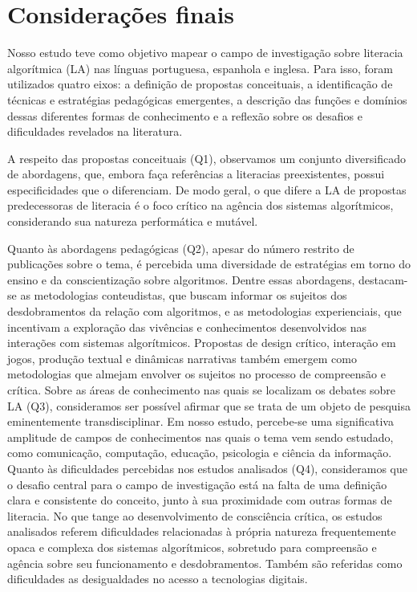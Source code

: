\section{Considerações finais}\label{sec-consideraçõesfinais}

Nosso estudo teve como objetivo mapear o campo de investigação sobre
literacia algorítmica (LA) nas línguas portuguesa, espanhola e inglesa.
Para isso, foram utilizados quatro eixos: a definição de propostas
conceituais, a identificação de técnicas e estratégias pedagógicas
emergentes, a descrição das funções e domínios dessas diferentes formas
de conhecimento e a reflexão sobre os desafios e dificuldades revelados
na literatura.

A respeito das propostas conceituais (Q1), observamos um conjunto
diversificado de abordagens, que, embora faça referências a literacias
preexistentes, possui especificidades que o diferenciam. De modo geral,
o que difere a LA de propostas predecessoras de literacia é o foco
crítico na agência dos sistemas algorítmicos, considerando sua natureza
performática e mutável.

Quanto às abordagens pedagógicas (Q2), apesar do número restrito de
publicações sobre o tema, é percebida uma diversidade de estratégias em
torno do ensino e da conscientização sobre algoritmos. Dentre essas
abordagens, destacam-se as metodologias conteudistas, que buscam
informar os sujeitos dos desdobramentos da relação com algoritmos, e as
metodologias experienciais, que incentivam a exploração das vivências e
conhecimentos desenvolvidos nas interações com sistemas algorítmicos.
Propostas de design crítico, interação em jogos, produção textual e
dinâmicas narrativas também emergem como metodologias que almejam
envolver os sujeitos no processo de compreensão e crítica. Sobre as
áreas de conhecimento nas quais se localizam os debates sobre LA (Q3),
consideramos ser possível afirmar que se trata de um objeto de pesquisa
eminentemente transdisciplinar. Em nosso estudo, percebe-se uma
significativa amplitude de campos de conhecimentos nas quais o tema vem
sendo estudado, como comunicação, computação, educação, psicologia e
ciência da informação. Quanto às dificuldades percebidas nos estudos
analisados (Q4), consideramos que o desafio central para o campo de
investigação está na falta de uma definição clara e consistente do
conceito, junto à sua proximidade com outras formas de literacia. No que
tange ao desenvolvimento de consciência crítica, os estudos analisados
referem dificuldades relacionadas à própria natureza frequentemente
opaca e complexa dos sistemas algorítmicos, sobretudo para compreensão e
agência sobre seu funcionamento e desdobramentos. Também são referidas
como dificuldades as desigualdades no acesso a tecnologias digitais.

